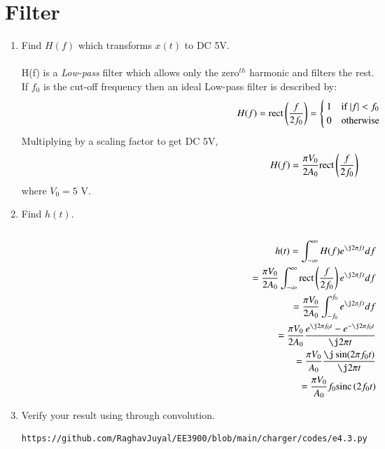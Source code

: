 \documentclass[journal,12pt,twocolumn]{IEEEtran}
\renewcommand\thesection{\arabic{section}}
\begin{document}
\section{Filter}
\begin{enumerate}[label=\thesection.\arabic*
,ref=\thesection.\theenumi]
\item Find $H(f)$ which transforms $x(t)$ to DC 5V.\\
\solution\\
H(f) is a \textit{Low-pass} filter which allows only the zero$^{th}$ harmonic and filters the rest.\\

If $f_0$ is the cut-off frequency then an ideal Low-pass filter is described by:
\begin{equation}
	H(f) = \rect{\frac{f}{2f_0}} = \begin{cases}
		1 \quad $if $ \abs{f} < f_0\\
		0 \quad $otherwise$
	\end{cases}
\end{equation}
Multiplying by a scaling factor to get DC 5V,
\begin{equation}
	H(f) = \frac{\pi V_0}{2A_0}\text{rect}\left(\frac{f}{2f_0}\right)
		\label{eq:Hf}
\end{equation}
where $V_0 = 5$ V.
\item Find $h(t)$.\\
\solution\\
\begin{align}
	h(t) = \int_{-\infty}^{\infty} H(f)e^{\j2\pi f t}df\\
	= \frac{\pi V_0}{2A_0} \int_{-\infty}^{\infty}\rect{\frac{f}{2f_0}} e^{\j2\pi f t}df\\
	= \frac{\pi V_0}{2A_0} \int_{-f_0}^{f_0} e^{\j2\pi f t}df\\
	= \frac{\pi V_0}{2A_0} \dfrac{e^{\j2\pi f_0 t} - e^{-\j2\pi f_0 t}}{\j2\pi t}\\
	= \frac{\pi V_0}{A_0} \dfrac{\j\sin(2\pi f_0 t)}{\j2\pi t}\\
	= \frac{\pi V_0}{A_0} f_0\sinc{2f_0 t}
\end{align}
\item Verify your result using  through convolution.
\solution
\begin{lstlisting}
https://github.com/RaghavJuyal/EE3900/blob/main/charger/codes/e4.3.py
\end{lstlisting}
\begin{figure}[!ht]
	\begin{center}

\end{center}
\end{figure}
\end{enumerate}
\end{document}
